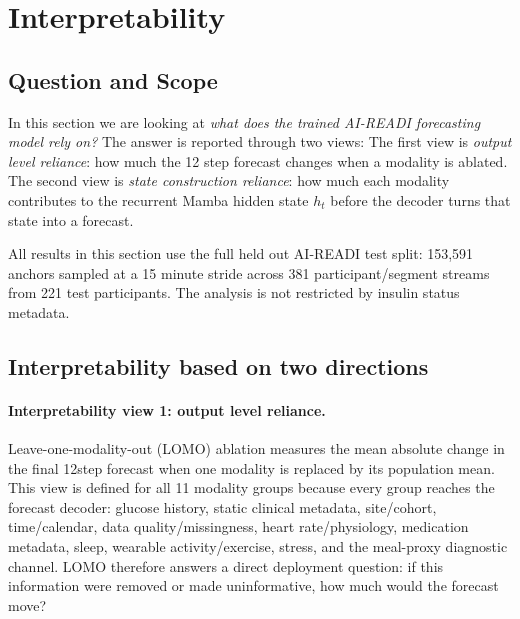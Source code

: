 \section{Interpretability}
\label{sec:interp}

\subsection{Question and Scope}
\label{subsec:interp_scope}

In this section we are looking at \emph{what does the trained AI-READI
forecasting model rely on?}
The answer is reported through two views:
The first view is \emph{output level reliance}: how much the 12 step forecast
changes when a modality is ablated.
The second view is \emph{state construction reliance}: how much each modality
contributes to the recurrent Mamba hidden state $h_t$ before the decoder turns
that state into a forecast.

All results in this section use the full held out AI-READI test split:
153{,}591 anchors sampled at a 15 minute stride across 381
participant/segment streams from 221 test participants.
The analysis is not restricted by insulin status metadata.

\subsection{Interpretability based on two directions}
\label{subsec:interp_two_views}

\paragraph{Interpretability view 1: output level reliance.}
Leave-one-modality-out (LOMO) ablation measures the mean absolute change in
the final 12step forecast when one modality is replaced by its population
mean.
This view is defined for all 11 modality groups because every group 
reaches the forecast decoder: glucose history, static clinical metadata,
site/cohort, time/calendar, data quality/missingness, heart rate/physiology,
medication metadata, sleep, wearable activity/exercise, stress, and the
meal-proxy diagnostic channel.
LOMO therefore answers a direct deployment question: if this information were
removed or made uninformative, how much would the forecast move?

